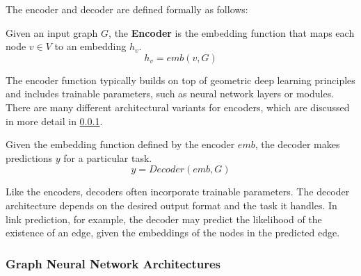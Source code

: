 The encoder and decoder are defined formally as follows:

\begin{definition}
    \label{d_Encoder}
    Given an input graph $G$, the \textbf{Encoder} is the embedding function that maps each node $v \in V$ to an embedding $h_v$.
    \begin{equation}
        h_v = emb(v, G)
    \end{equation}
\end{definition}

The encoder function typically builds on top of geometric deep learning principles and includes trainable parameters, such as neural network layers or modules. There are many different architectural variants for encoders, which are discussed in more detail in \ref{s_Background_GNNs_GNNArchtectures}. 

\begin{definition}
    \label{d_Decoder}
    Given the embedding function defined by the encoder $emb$, the decoder makes predictions $y$ for a particular task.
    \begin{equation}
        y = Decoder(emb, G)
    \end{equation}
\end{definition}

Like the encoders, decoders often incorporate trainable parameters. The decoder architecture depends on the desired output format and the task it handles. In link prediction, for example, the decoder may predict the likelihood of the existence of an edge, given the embeddings of the nodes in the predicted edge.

\subsubsection{Graph Neural Network Architectures}
\label{s_Background_GNNs_GNNArchtectures}

